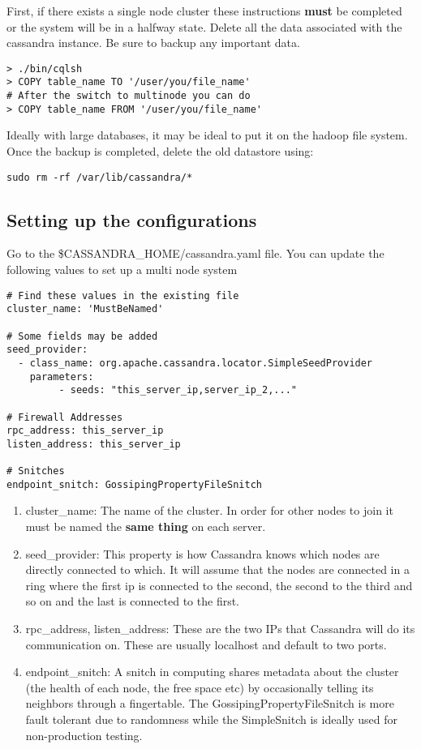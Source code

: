 \documentclass[9pt,twocolumn,twoside]{idsi}
\begin{document}
First, if there exists a single node cluster these instructions \textbf{must} be completed or the system will be in a halfway state. Delete all the data associated with the cassandra instance. Be sure to backup any important data.


\begin{lstlisting}
> ./bin/cqlsh
> COPY table_name TO '/user/you/file_name'
# After the switch to multinode you can do
> COPY table_name FROM '/user/you/file_name'
\end{lstlisting}

Ideally with large databases, it may be ideal to put it on the hadoop file system. Once the backup is completed, delete the old datastore using:

\begin{lstlisting}[breaklines]
sudo rm -rf /var/lib/cassandra/*
\end{lstlisting}

\subsection{Setting up the configurations}

Go to the \$CASSANDRA\_HOME/cassandra.yaml file. You can update the following values to set up a multi node system

\begin{lstlisting}[breaklines]
# Find these values in the existing file
cluster_name: 'MustBeNamed'

# Some fields may be added
seed_provider:
  - class_name: org.apache.cassandra.locator.SimpleSeedProvider
    parameters:
         - seeds: "this_server_ip,server_ip_2,..."

# Firewall Addresses
rpc_address: this_server_ip
listen_address: this_server_ip

# Snitches
endpoint_snitch: GossipingPropertyFileSnitch

\end{lstlisting}

\begin{enumerate}
\item cluster\_name: The name of the cluster. In order for other nodes to join it must be named the \textbf{same thing} on each server.
\item seed\_provider: This property is how Cassandra knows which nodes are directly connected to which. It will assume that the nodes are connected in a ring where the first ip is connected to the second, the second to the third and so on and the last is connected to the first.
\item rpc\_address, listen\_address: These are the two IPs that Cassandra will do its communication on. These are usually localhost and default to two ports.
\item endpoint\_snitch: A snitch in computing shares metadata about the cluster (the health of each node, the free space etc) by occasionally telling its neighbors through a fingertable. The GossipingPropertyFileSnitch is more fault tolerant due to randomness while the SimpleSnitch is ideally used for non-production testing.
\end{enumerate}
\end{document}
